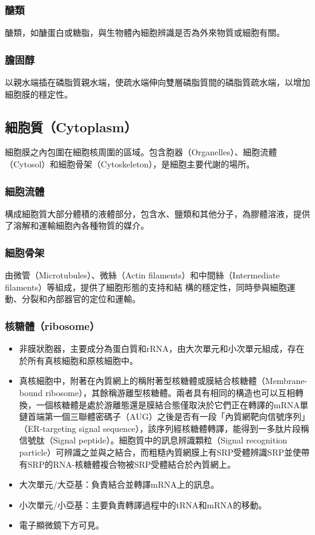 \documentclass[a4paper,12pt]{report}
\begin{document}
\subsubsection{醣類}
醣類，如醣蛋白或糖脂，與生物體內細胞辨識是否為外來物質或細胞有關。
\subsubsection{膽固醇}
以親水端插在磷脂質親水端，使疏水端伸向雙層磷脂質間的磷脂質疏水端，以增加細胞膜的穩定性。
\subsection{細胞質（Cytoplasm）}
細胞膜之內包圍在細胞核周圍的區域。包含胞器（Organelles）、細胞流體（Cytosol）和細胞骨架（Cytoskeleton），是細胞主要代謝的場所。
\subsubsection{細胞流體}
構成細胞質大部分體積的液體部分，包含水、鹽類和其他分子，為膠體溶液，提供了溶解和運輸細胞內各種物質的媒介。
\subsubsection{細胞骨架}
由微管（Microtubules）、微絲（Actin filaments）和中間絲（Intermediate filaments）等組成，提供了細胞形態的支持和結 構的穩定性，同時參與細胞運動、分裂和內部器官的定位和運輸。
\subsubsection{核糖體（ribosome）}
\begin{itemize}
  \item 非膜狀胞器，主要成分為蛋白質和rRNA，由大次單元和小次單元組成，存在於所有真核細胞和原核細胞中。
  \item 真核細胞中，附著在內質網上的稱附著型核糖體或膜結合核糖體（Membrane-bound ribosome），其餘稱游離型核糖體。兩者具有相同的構造也可以互相轉換，一個核糖體是處於游離態還是膜結合態僅取決於它們正在轉譯的mRNA單鏈首端第一個三聯體密碼子（AUG）之後是否有一段「內質網靶向信號序列」（ER-targeting signal sequence），該序列經核糖體轉譯，能得到一多肽片段稱信號肽（Signal peptide）。細胞質中的訊息辨識顆粒（Signal recognition particle）可辨識之並與之結合，而粗糙內質網膜上有SRP受體辨識SRP並使帶有SRP的RNA-核糖體複合物被SRP受體結合於內質網上。
  \item 大次單元/大亞基：負責結合並轉譯mRNA上的訊息。
  \item 小次單元/小亞基：主要負責轉譯過程中的tRNA和mRNA的移動。
  \item 電子顯微鏡下方可見。
  \end{itemize}
\end{document}
